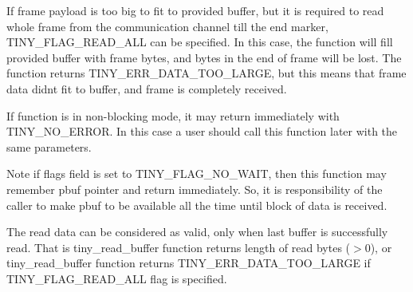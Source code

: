 If frame payload is too big to fit to provided buffer, but it is required to read whole frame from the communication channel till the end marker, T\+I\+N\+Y\+\_\+\+F\+L\+A\+G\+\_\+\+R\+E\+A\+D\+\_\+\+A\+L\+L can be specified. In this case, the function will fill provided buffer with frame bytes, and bytes in the end of frame will be lost. The function returns T\+I\+N\+Y\+\_\+\+E\+R\+R\+\_\+\+D\+A\+T\+A\+\_\+\+T\+O\+O\+\_\+\+L\+A\+R\+G\+E, but this means that frame data didn\textquotesingle{}t fit to buffer, and frame is completely received.

If function is in non-\/blocking mode, it may return immediately with T\+I\+N\+Y\+\_\+\+N\+O\+\_\+\+E\+R\+R\+O\+R. In this case a user should call this function later with the same parameters.

\begin{DoxyNote}{Note}
if flags field is set to T\+I\+N\+Y\+\_\+\+F\+L\+A\+G\+\_\+\+N\+O\+\_\+\+W\+A\+I\+T, then this function may remember pbuf pointer and return immediately. So, it is responsibility of the caller to make pbuf to be available all the time until block of data is received.

The read data can be considered as valid, only when last buffer is successfully read. That is tiny\+\_\+read\+\_\+buffer function returns length of read bytes ($>$0), or tiny\+\_\+read\+\_\+buffer function returns T\+I\+N\+Y\+\_\+\+E\+R\+R\+\_\+\+D\+A\+T\+A\+\_\+\+T\+O\+O\+\_\+\+L\+A\+R\+G\+E if T\+I\+N\+Y\+\_\+\+F\+L\+A\+G\+\_\+\+R\+E\+A\+D\+\_\+\+A\+L\+L flag is specified.
\end{DoxyNote}

